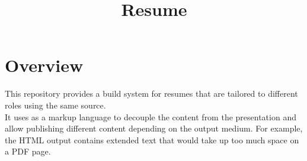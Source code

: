 \documentclass{article}
\title{Resume}
\begin{document}
\maketitle

\section{Overview}
This repository provides a build system for resumes that are tailored to 
different roles using the same source.\\
It uses \latex as a markup language to decouple the content from the
presentation and allow publishing different content depending on the output
medium.  For example, the HTML output contains extended text that would take up
too much space on a PDF page.
\end{document}
